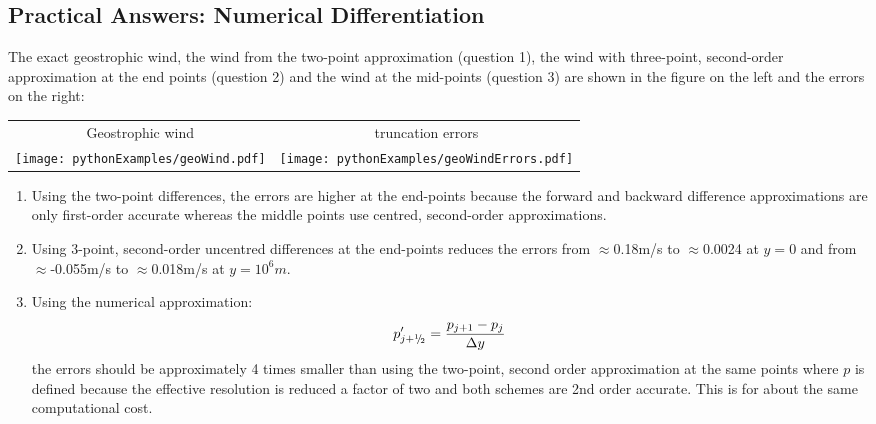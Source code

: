 \subsection{Practical Answers: Numerical Differentiation}

The exact geostrophic wind, the wind from the two-point approximation (question 1), the wind with three-point, second-order approximation at the end points (question 2) and the wind at the mid-points (question 3) are shown in the figure on the left and the errors on the right:

\begin{tabular}{cc}
Geostrophic wind  & truncation errors \\
\texttt{[image: pythonExamples/geoWind.pdf]}
&
\texttt{[image: pythonExamples/geoWindErrors.pdf]}
\end{tabular}

\begin{enumerate}
\item Using the two-point differences, the errors are higher at the end-points because the forward and backward difference approximations are only first-order accurate whereas the middle points use centred, second-order approximations.

\item Using 3-point, second-order uncentred differences at the end-points reduces the errors from $\approx$0.18m/s to $\approx$0.0024 at $y=0$ and from $\approx$-0.055m/s to $\approx$0.018m/s at $y=10^6 m$.

\item Using the numerical approximation:
\[
p^\prime_{j+{^1\negthickspace/\negthinspace_2}} = \frac{p_{j+1} - p_{j}}{\Delta y}
\]
the errors should be approximately 4 times smaller than using the two-point, second order approximation at the same points where $p$ is defined because the effective resolution is reduced a factor of two and both schemes are 2nd order accurate. This is for about the same computational cost.

\end{enumerate}
